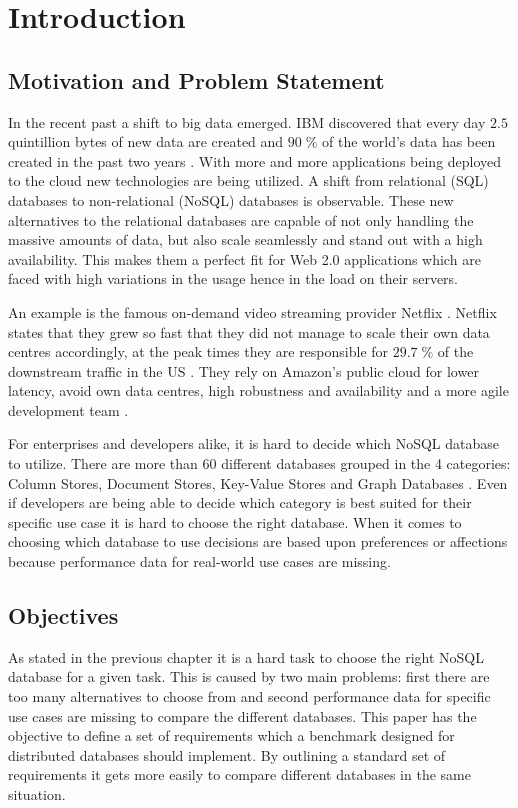 
\chapter{Introduction}
\label{cha:introduction}

\section{Motivation and Problem Statement}
\label{sec:motivation-and-problem-statement}
In the recent past a shift to big data emerged. IBM discovered that every day $2.5$ quintillion bytes of new data are created and $90\;\%$ of the world's data has been created in the past two years \cite{ibm.2014}. With more and more applications being deployed to the cloud new technologies are being utilized. A shift from relational (SQL) databases to non-relational (NoSQL) databases is observable. These new alternatives to the relational databases are capable of not only handling the massive amounts of data, but also scale seamlessly and stand out with a high availability. This makes them a perfect fit for Web 2.0 applications which are faced with high variations in the usage hence in the load on their servers.

An example is the famous on-demand video streaming provider Netflix \cite{netflix.2014}. Netflix states that they grew so fast that they did not manage to scale their own data centres accordingly, at the peak times they are responsible for $29.7\;\%$ of the downstream traffic in the US \cite[1]{adhikari.2012}. They rely on Amazon's public cloud for lower latency, avoid own data centres, high robustness and availability and a more agile development team \cite[24]{netflix.2011}.

For enterprises and developers alike, it is hard to decide which NoSQL database to utilize. There are more than 60 different databases grouped in the 4 categories: Column Stores, Document Stores, Key-Value Stores and Graph Databases \cite[1 - 2]{tudorica.2011}. Even if developers are being able to decide which category is best suited for their specific use case it is hard to choose the right database. When it comes to choosing which database to use decisions are based upon preferences or affections because performance data for real-world use cases are missing.

\section{Objectives}
\label{sec:objectives}
As stated in the previous chapter it is a hard task to choose the right NoSQL database for a given task. This is caused by two main problems: first there are too many alternatives to choose from and second performance data for specific use cases are missing to compare the different databases.
This paper has the objective to define a set of requirements which a benchmark designed for distributed databases should implement. By outlining a standard set of requirements it gets more easily to compare different databases in the same situation.

